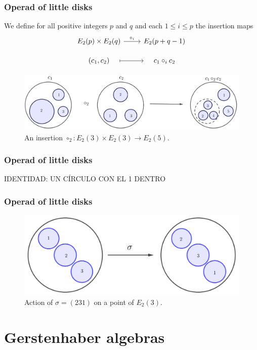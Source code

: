 \documentclass{beamer}
\theoremstyle{definition}
\begin{document}
\begin{frame}[fragile]
	\frametitle{Operad of little disks}
	
	 We define for all positive integers $p$ and $q$ and  each $1\leq i\leq p$ the insertion maps 
$$	
\begin{tikzcd}[row sep=10]
E_2(p)\times E_2(q)\arrow[r, "\circ_i"] & E_2(p+q-1)\\
(c_1,c_2)\arrow[r, mapsto, shorten <= 1em, shorten >= 1em] & c_1\circ_i c_2
\end{tikzcd}
$$

 \begin{figure}[h!]
	\centering
	\includegraphics[scale=0.2]{Imagenes/insertion}
	\caption{An insertion $\circ_2:E_2(3)\times E_2(3)\to E_2(5)$.}
\end{figure}
	
\end{frame}

\begin{frame}
	\frametitle{Operad of little disks}
	IDENTIDAD: UN CÍRCULO CON EL 1 DENTRO
\end{frame}
\begin{frame}
	\frametitle{Operad of little disks}
	\begin{figure}[h!]
		\includegraphics[scale=0.35]{Imagenes//accion}
		\caption{Action of $\sigma=(231)$ on a point of $E_2(3)$.}
	\end{figure}
\end{frame}


\section{Gerstenhaber algebras}
\end{document}
